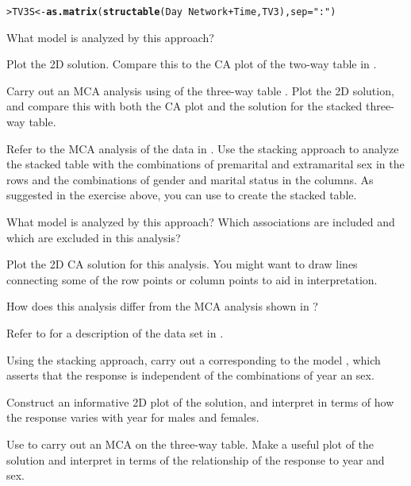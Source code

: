 \documentclass[11pt]{report}\usepackage[]{graphicx}\usepackage[]{color}
\makeatletter
\newcommand{\hlstr}[1]{\textcolor[rgb]{0.192,0.494,0.8}{#1}}%
\newcommand{\hlopt}[1]{\textcolor[rgb]{0,0,0}{#1}}%
\newcommand{\hlstd}[1]{\textcolor[rgb]{0.345,0.345,0.345}{#1}}%
\newcommand{\hlkwb}[1]{\textcolor[rgb]{0.69,0.353,0.396}{#1}}%
\newcommand{\hlkwc}[1]{\textcolor[rgb]{0.333,0.667,0.333}{#1}}%
\newcommand{\hlkwd}[1]{\textcolor[rgb]{0.737,0.353,0.396}{\textbf{#1}}}%
\newenvironment{kframe}{%
 \def\at@end@of@kframe{}%
 \ifinner\ifhmode%
  \def\at@end@of@kframe{\end{minipage}}%
  \begin{minipage}{\columnwidth}%
 \fi\fi%
 \def\FrameCommand##1{\hskip\@totalleftmargin \hskip-\fboxsep
 \colorbox{shadecolor}{##1}\hskip-\fboxsep
     \hskip-\linewidth \hskip-\@totalleftmargin \hskip\columnwidth}%
 \MakeFramed {\advance\hsize-\width
   \@totalleftmargin\z@ \linewidth\hsize
   \@setminipage}}%
 {\par\unskip\endMakeFramed%
 \at@end@of@kframe}
\newenvironment{knitrout}{}{} %
\renewenvironment{knitrout}{\small\renewcommand{\baselinestretch}{.85}}{} %
\makeatother
\begin{document}
\begin{Exercises}
\begin{enumerate*}
\begin{knitrout}
\begin{kframe}
\begin{alltt}
\hlstd{> }\hlstd{TV3S} \hlkwb{<-} \hlkwd{as.matrix}\hlstd{(}\hlkwd{structable}\hlstd{(Day} \hlopt{~} \hlstd{Network} \hlopt{+} \hlstd{Time, TV3),} \hlkwc{sep}\hlstd{=}\hlstr{":"}\hlstd{)}
\end{alltt}
\end{kframe}
\end{knitrout}
    \item What \loglin model is analyzed by this approach?
    \item Plot the 2D solution.  Compare this to the CA plot of the two-way table in .
    \item Carry out an MCA analysis using  of the three-way table .  Plot the 2D solution,
    and compare this with both the CA plot and the solution for the stacked three-way table.  
  \end{enumerate*}

 \exercise\label{lab:presex} Refer to the MCA analysis of the  data in .
   	  Use the stacking approach to analyze the stacked table with the combinations of 
  	  premarital and extramarital sex in the rows and the combinations of gender and marital status
  	  in the columns.  As suggested in the exercise above, you can use 
  	   to create the stacked table.

  \begin{enumerate*}
  	  \item What \loglin model is analyzed by this approach? Which associations are included and
  	  which are excluded in this analysis?
  	  \item Plot the 2D CA solution for this analysis.  You might want to draw lines connecting
  	  some of the row points or column points to aid in interpretation.
  	  \item How does this analysis differ from the MCA analysis shown in ? 
  \end{enumerate*}

\exercise\label{lab:ca-vietnam} Refer to  for a description of the  data set
  in . 
  \begin{enumerate*}
    \item Using the stacking approach, carry out a \ca corresponding to the \loglin model , which asserts
    that the response is independent of the combinations of year an sex.  
    \item Construct an informative 2D plot of the solution, and interpret in terms of how the response varies with year for
    males and females.
    \item Use  to carry out an MCA on the three-way table.  Make a useful plot of the solution and interpret
    in terms of the relationship of the response to year and sex.
  \end{enumerate*}


\end{Exercises}
\end{document}
